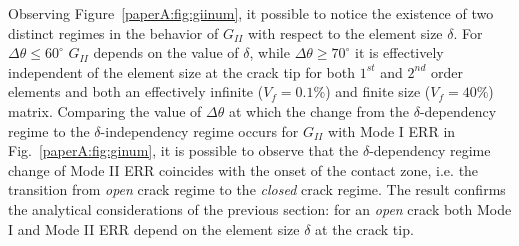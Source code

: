 Observing Figure~\ref{paperA:fig:giinum}, it possible to notice the existence of two distinct regimes in the behavior of $G_{II}$ with respect to the element size $\delta$. For $\Delta\theta\leq60^{\circ}$ $G_{II}$ depends on the value of $\delta$, while $\Delta\theta\geq70^{\circ}$ it is effectively independent of the element size at the crack tip for both $1^{st}$ and $2^{nd}$ order elements and both an effectively infinite ($V_{f}=0.1\%$) and finite size ($V_{f}=40\%$) matrix. Comparing the value of $\Delta\theta$ at which the change from the $\delta$-dependency regime to the $\delta$-independency regime occurs for $G_{II}$ with Mode I ERR in Fig.~\ref{paperA:fig:ginum}, it is possible to observe that the $\delta$-dependency regime change of Mode II ERR coincides with the onset of the contact zone, i.e. the transition from \emph{open} crack regime to the \emph{closed} crack regime. The result confirms the analytical considerations of the previous section: for an \emph{open} crack both Mode I and Mode II ERR depend on the element size $\delta$ at the crack tip.

